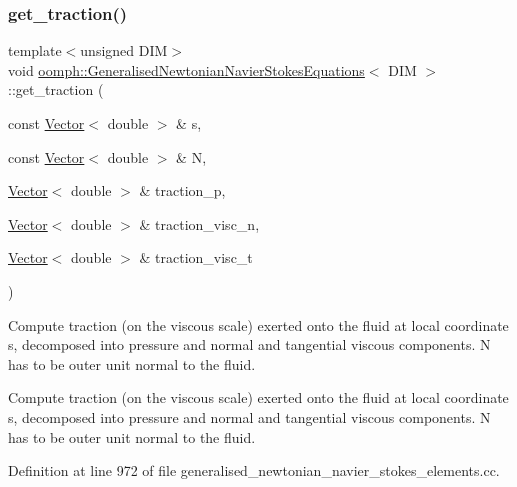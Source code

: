 \mbox{\label{classoomph_1_1GeneralisedNewtonianNavierStokesEquations_a98e08b7402b4750ece2a18e4579a00dd}} 
\subsubsection{\texorpdfstring{get\+\_\+traction()}{get\_traction()}\hspace{0.1cm}{\footnotesize\ttfamily [2/2]}}
{\footnotesize\ttfamily template$<$unsigned D\+IM$>$ \\
void \hyperlink{classoomph_1_1GeneralisedNewtonianNavierStokesEquations}{oomph\+::\+Generalised\+Newtonian\+Navier\+Stokes\+Equations}$<$ D\+IM $>$\+::get\+\_\+traction (\begin{DoxyParamCaption}\item[{const \hyperlink{classoomph_1_1Vector}{Vector}$<$ double $>$ \&}]{s,  }\item[{const \hyperlink{classoomph_1_1Vector}{Vector}$<$ double $>$ \&}]{N,  }\item[{\hyperlink{classoomph_1_1Vector}{Vector}$<$ double $>$ \&}]{traction\+\_\+p,  }\item[{\hyperlink{classoomph_1_1Vector}{Vector}$<$ double $>$ \&}]{traction\+\_\+visc\+\_\+n,  }\item[{\hyperlink{classoomph_1_1Vector}{Vector}$<$ double $>$ \&}]{traction\+\_\+visc\+\_\+t }\end{DoxyParamCaption})}



Compute traction (on the viscous scale) exerted onto the fluid at local coordinate s, decomposed into pressure and normal and tangential viscous components. N has to be outer unit normal to the fluid. 

Compute traction (on the viscous scale) exerted onto the fluid at local coordinate s, decomposed into pressure and normal and tangential viscous components. N has to be outer unit normal to the fluid. 

Definition at line 972 of file generalised\+\_\+newtonian\+\_\+navier\+\_\+stokes\+\_\+elements.\+cc.



